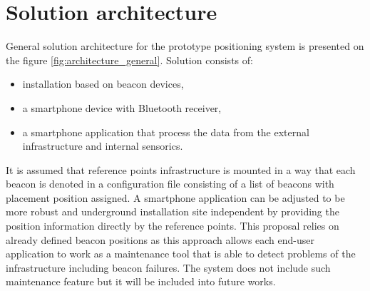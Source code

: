 \documentclass[../main.tex]{subfiles}
\begin{document}

\section{Solution architecture} %
\label{sec:solution_architecture}

General solution architecture for the prototype positioning system is presented on the figure \ref{fig:architecture_general}. Solution consists of:
\begin{itemize}
	\item installation based on beacon devices,
	\item a smartphone device with Bluetooth receiver,
	\item a smartphone application that process the data from the external infrastructure and internal sensorics.
\end{itemize}

It is assumed that reference points infrastructure is mounted in a way that each beacon is denoted in a configuration file consisting of a list of beacons with placement position assigned. A smartphone application can be adjusted to be more robust and underground installation site independent by providing the position information directly by the reference points. This proposal relies on already defined beacon positions as this approach allows each end-user application to work as a maintenance tool that is able to detect problems of the infrastructure including beacon failures. The system does not include such maintenance feature but it will be included into future works.
\end{document}
